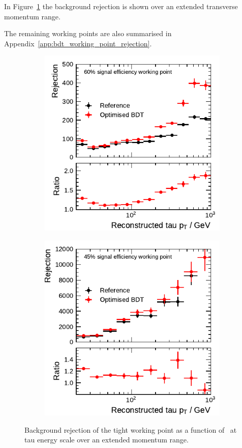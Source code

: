 In Figure~\ref{fig:rejection_highpt} the background rejection is shown over an
extended transverse momentum range.

The remaining working points are also
summarised in Appendix~\ref{app:bdt_working_point_rejection}.

\begin{figure}[htbp]
  \centering
  \begin{subfigure}[t]{0.48\textwidth}
    \centering
    \includegraphics{./figures/bdt_perf/post_optimisation/1p_highpt/rejection_tight_ratio_highpt.pdf}
  \end{subfigure}\hfill
  \begin{subfigure}[t]{0.48\textwidth}
    \centering
    \includegraphics{./figures/bdt_perf/post_optimisation/3p_highpt/rejection_tight_ratio_highpt.pdf}
  \end{subfigure}
  \caption{Background rejection of the tight working point as a function of
    \tauhadvis~\pt at tau energy scale over an extended momentum range.}
  \label{fig:rejection_highpt}
\end{figure}

